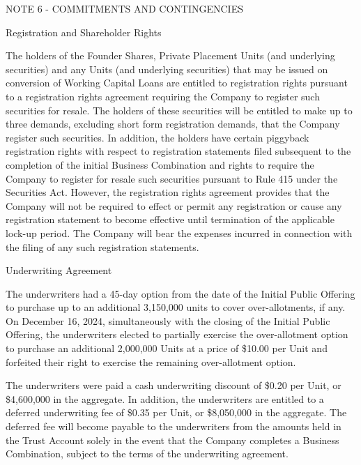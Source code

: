 \documentclass[11pt,a4paper]{article}
\begin{document}
NOTE 6 - COMMITMENTS AND CONTINGENCIES

Registration and Shareholder Rights

The holders of the Founder Shares, Private Placement Units (and underlying securities) and any Units (and underlying securities) that may be issued on conversion of Working Capital Loans are entitled to registration rights pursuant to a registration rights agreement requiring the Company to register such securities for resale. The holders of these securities will be entitled to make up to three demands, excluding short form registration demands, that the Company register such securities. In addition, the holders have certain piggyback registration rights with respect to registration statements filed subsequent to the completion of the initial Business Combination and rights to require the Company to register for resale such securities pursuant to Rule 415 under the Securities Act. However, the registration rights agreement provides that the Company will not be required to effect or permit any registration or cause any registration statement to become effective until termination of the applicable lock-up period. The Company will bear the expenses incurred in connection with the filing of any such registration statements.

Underwriting Agreement

The underwriters had a 45-day option from the date of the Initial Public Offering to purchase up to an additional 3,150,000 units to cover over-allotments, if any. On December 16, 2024, simultaneously with the closing of the Initial Public Offering, the underwriters elected to partially exercise the over-allotment option to purchase an additional 2,000,000 Units at a price of \$10.00 per Unit and forfeited their right to exercise the remaining over-allotment option.

The underwriters were paid a cash underwriting discount of \$0.20 per Unit, or \$4,600,000 in the aggregate. In addition, the underwriters are entitled to a deferred underwriting fee of \$0.35 per Unit, or \$8,050,000 in the aggregate. The deferred fee will become payable to the underwriters from the amounts held in the Trust Account solely in the event that the Company completes a Business Combination, subject to the terms of the underwriting agreement.
\end{document}
